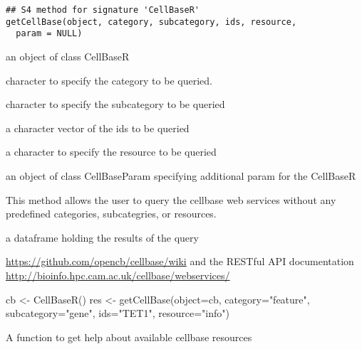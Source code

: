 \documentclass[letterpaper]{book}
\begin{document}
%
\begin{Usage}
\begin{verbatim}
## S4 method for signature 'CellBaseR'
getCellBase(object, category, subcategory, ids, resource,
  param = NULL)
\end{verbatim}
\end{Usage}
%
\begin{Arguments}
\begin{ldescription}
\item[\code{object}] an object of class CellBaseR

\item[\code{category}] character to specify the category to be queried.

\item[\code{subcategory}] character to specify the subcategory to be queried

\item[\code{ids}] a character vector of the ids to be queried

\item[\code{resource}] a character to specify the resource to be queried

\item[\code{param}] an object of class CellBaseParam specifying additional param
for the CellBaseR
\end{ldescription}
\end{Arguments}
%
\begin{Details}\relax
This method allows the user to query the 
cellbase web services without any  predefined categories, subcategries, 
or resources.
\end{Details}
%
\begin{Value}
a dataframe holding the results of the query
\end{Value}
%
\begin{SeeAlso}\relax
\url{https://github.com/opencb/cellbase/wiki} 
and the RESTful API documentation 
\url{http://bioinfo.hpc.cam.ac.uk/cellbase/webservices/}
\end{SeeAlso}
%
\begin{Examples}
\begin{ExampleCode}
   cb <- CellBaseR()
   res <- getCellBase(object=cb, category="feature", subcategory="gene", 
   ids="TET1", resource="info")
\end{ExampleCode}
\end{Examples}
%
\begin{Description}\relax
A function to get help about available cellbase resources
\end{Description}
\end{document}
